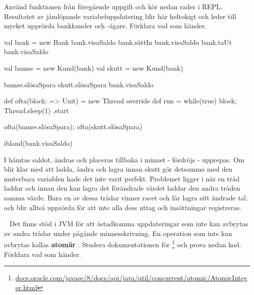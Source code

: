 \Subtask Använd funktionen  från föregående uppgift och kör nedan rader i REPL. Resultatet av jämlöpande variabeluppdatering blir här heltokigt och leder till mycket upprörda bankkunder och -ägare. Förklara vad som händer.

\begin{REPL}
val bank = new Bank
bank.visaSaldo
bank.sättIn
bank.visaSaldo
bank.taUt
bank.visaSaldo

val bamse = new Kund(bank)
val skutt = new Kund(bank)

bamse.slösaSpara
skutt.slösaSpara
bank.visaSaldo

def ofta(block: => Unit) = new Thread {
  override def run = while(true) { block; Thread.sleep(1) }
}.start

ofta(bamse.slösaSpara); ofta(skutt.slösaSpara)

ibland(bank.visaSaldo)
\end{REPL}


\SOLUTION


\TaskSolved \what

\SubtaskSolved  I  hämtas saldot, ändras och placeras tillbaka i minnet -  fördröjs -  upprepas. Om  blir klar med att ladda, ändra och lagra innan skutt gör detsamma med den muterbara variablen hade det inte varit perfekt. Problemet ligger i  när en tråd laddar och innan den kan lagra det förändrade värdet laddar den andra tråden samma värde. Bara en av dessa trådar vinner racet och får lagra sitt ändrade tal.  och  blir alltså upprörda för att inte alla dess uttag och insättningar registreras.


\QUESTEND







\QUESTBEGIN

\Task  \what~  Det finns stöd i JVM för att åstadkomma uppdateringar som inte kan avbrytas av andra trådar under pågånde minnesskrivning. En operation som inte kan avbrytas kallas \textbf{atomär} . Studera dokumentationen för \footnote{\href{https://docs.oracle.com/javase/8/docs/api/java/util/concurrent/atomic/AtomicInteger.html}{docs.oracle.com/javase/8/docs/api/java/util/concurrent/atomic/AtomicInteger.html}} och prova nedan kod. Förklara vad som händer.


